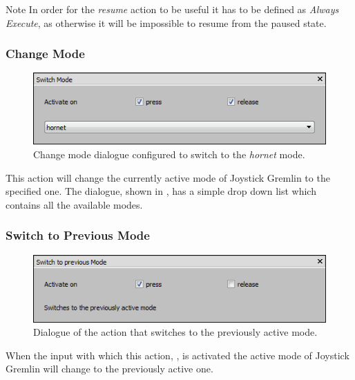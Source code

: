 \documentclass[a4, 10pt]{article}
\newcommand{\JG}{Joystick Gremlin}
\begin{document}
\vspace{1em}
\begin{bclogo}[
    couleur=yellow!40,
    couleurBord=orange!80,
    couleurBarre=orange!80,
    arrondi=0.1,
    logo=\bcinfo
]{Note}
    In order for the \emph{resume} action to be useful it has to be
    defined as \emph{Always Execute}, as otherwise it will be impossible
    to resume from the paused state.
\end{bclogo}


\subsubsection{Change Mode}

\begin{figure}[bt]
    \centering

    \includegraphics[width=0.75\linewidth]{images/action_switch_mode}
    \caption{Change mode dialogue configured to switch to the
        \emph{hornet} mode.}
    \label{fig:action_change_mode}
\end{figure}

This action will change the currently active mode of \JG{} to the
specified one. The dialogue,  shown in , has
a simple drop down list which contains all the available modes.


\subsubsection{Switch to Previous Mode}

\begin{figure}[bt]
    \centering

    \includegraphics[width=0.75\linewidth]{images/action_switch_previous_mode}
    \caption{Dialogue of the action that switches to the previously
    active mode.}
    \label{fig:action_previous_mode}
\end{figure}

When the input with which this action, , is
activated the active mode of \JG{} will change to the previously active
one.
\end{document}
